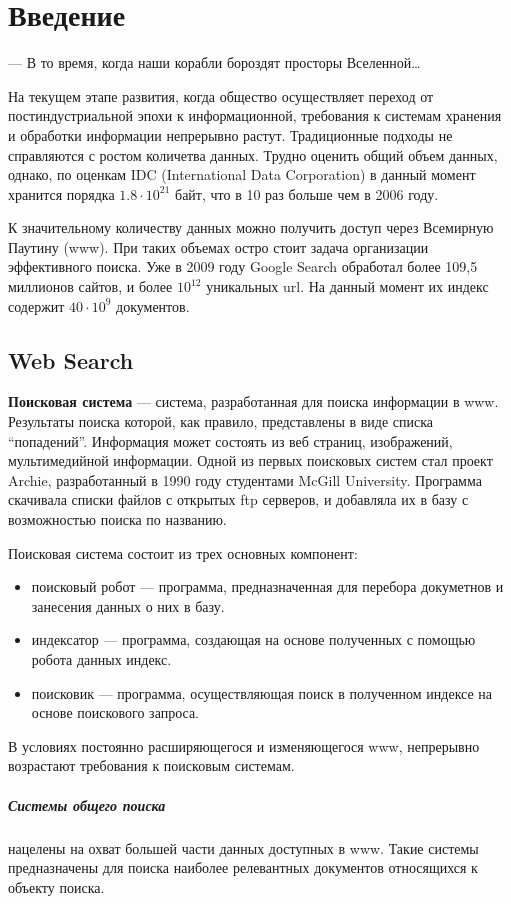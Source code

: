 \chapter{Введение} 
\epigraph{— В то время, когда наши корабли бороздят просторы
Вселенной…}{} На текущем этапе развития, когда общество осуществляет переход от
постиндустриальной эпохи к информационной, требования к системам хранения и
обработки информации непрерывно растут. Традиционные подходы не справляются с
ростом количетва данных. Трудно оценить общий объем данных, однако, по оценкам
IDC (International Data Corporation) в данный момент хранится порядка
$1.8\cdot10^{21}$ байт, что в 10 раз больше чем в 2006 году.

К значительному количеству данных можно получить доступ через Всемирную Паутину (www). При таких объемах остро стоит задача организации эффективного поиска. Уже в 2009 году Google Search обработал
более 109,5 миллионов сайтов, и более $10^{12}$ уникальных url. На данный момент их индекс содержит $40\cdot10^{9}$ документов.

\section{Web Search} 
\textbf{Поисковая система} --- система, разработанная для
поиска информации в www. Результаты поиска которой, как правило, представлены в
виде списка ``попадений''. Информация может состоять из веб страниц,  изображений,
мультимедийной информации. Одной из первых поисковых систем стал
проект Archie, разработанный в 1990 году студентами McGill University. Программа скачивала
списки файлов с открытых ftp серверов, и добавляла их в базу с возможностью
поиска по названию. %

Поисковая система состоит из трех основных компонент: 
\begin{itemize}
 \item поисковый робот --- программа, предназначенная для перебора докуметнов и
занесения данных о них в базу. 
 \item индексатор --- программа, создающая на основе полученных с помощью робота данных индекс.
 \item поисковик --- программа, осуществляющая поиск в полученном индексе на основе поискового запроса.
\end{itemize} В условиях постоянно расширяющегося и изменяющегося www, непрерывно
возрастают требования к поисковым системам. 

\paragraph{Системы общего поиска} нацелены на охват большей части данных
доступных в www. Такие системы предназначены для поиска наиболее релевантных
документов относящихся к объекту поиска. 
